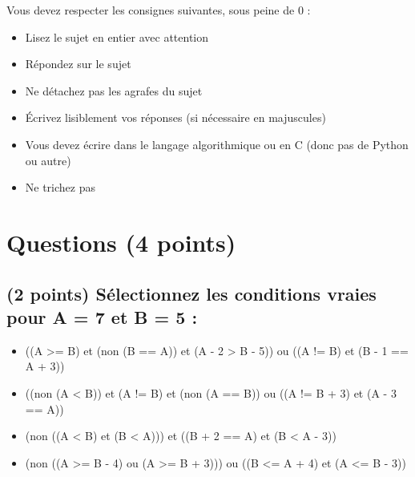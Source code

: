 \documentclass[11pt,a4paper]{article}
\begin{document}
\MakeExamTitle                   %


\bigskip

Vous devez respecter les consignes suivantes, sous peine de 0 :

\begin{itemize}
\item Lisez le sujet en entier avec attention
\item Répondez sur le sujet
\item Ne détachez pas les agrafes du sujet
\item \'Ecrivez lisiblement vos réponses (si nécessaire en majuscules)
\item Vous devez écrire dans le langage algorithmique ou en C (donc pas de Python ou autre)
\item Ne trichez pas
\end{itemize}


\vfillFirst


\section{Questions (4 points)}

\subsection{(2 points) Sélectionnez les conditions vraies pour A = 7 et B = 5 : }

\bigskip

\begin{itemize}
  \item[\checkmark] ((A >= B) et (non (B == A)) et (A - 2 > B - 5)) ou ((A != B) et (B - 1 == A + 3)) \\ %
  \item[\checkmark] ((non (A < B)) et (A != B) et (non (A == B)) ou ((A != B + 3) et (A - 3 == A)) \\ %
  \item[\CaseCoche] (non ((A < B) et (B < A))) et ((B + 2 == A) et (B < A - 3)) \\ %
  \item[\CaseCoche] (non ((A >= B - 4) ou (A >= B + 3))) ou ((B <= A + 4) et (A <= B - 3)) \\ %
\end{itemize}
\end{document}
